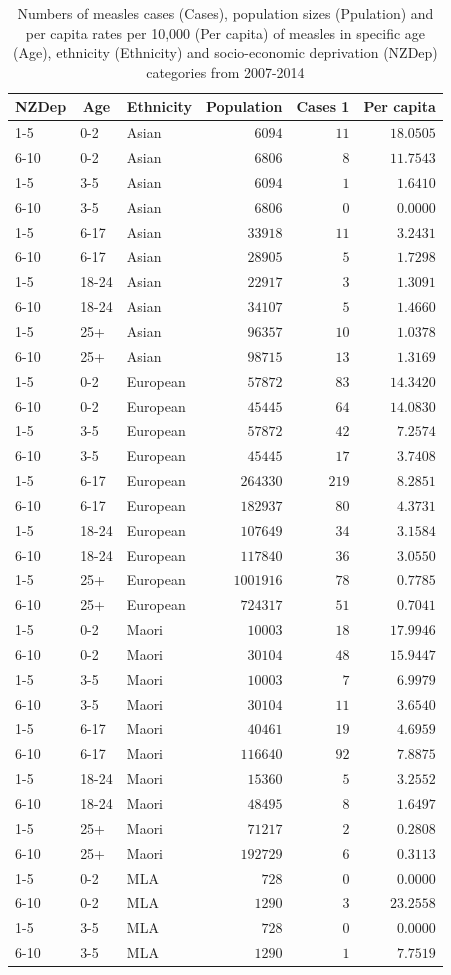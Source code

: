 \documentclass{article}
\begin{document}
\begin{table}[hbtp]
\footnotesize
\caption{Numbers of measles cases (Cases), population sizes (Ppulation) and per capita rates per 10,000 (Per capita) of measles in specific age (Age), ethnicity (Ethnicity) and socio-economic deprivation (NZDep) categories from 2007-2014}
\begin{center}
\begin{tabular}{lllrrr}
\hline\hline
\multicolumn{1}{c}{NZDep}&\multicolumn{1}{c}{Age}&\multicolumn{1}{c}{Ethnicity}&\multicolumn{1}{c}{Population}&\multicolumn{1}{c}{Cases 1}&\multicolumn{1}{c}{Per capita}\tabularnewline
\hline
1-5&0-2&Asian&$   6094$&$ 11$&$18.0505$\tabularnewline
6-10&0-2&Asian&$   6806$&$  8$&$11.7543$\tabularnewline
1-5&3-5&Asian&$   6094$&$  1$&$ 1.6410$\tabularnewline
6-10&3-5&Asian&$   6806$&$  0$&$ 0.0000$\tabularnewline
1-5&6-17&Asian&$  33918$&$ 11$&$ 3.2431$\tabularnewline
6-10&6-17&Asian&$  28905$&$  5$&$ 1.7298$\tabularnewline
1-5&18-24&Asian&$  22917$&$  3$&$ 1.3091$\tabularnewline
6-10&18-24&Asian&$  34107$&$  5$&$ 1.4660$\tabularnewline
1-5&25+&Asian&$  96357$&$ 10$&$ 1.0378$\tabularnewline
6-10&25+&Asian&$  98715$&$ 13$&$ 1.3169$\tabularnewline
1-5&0-2&European&$  57872$&$ 83$&$14.3420$\tabularnewline
6-10&0-2&European&$  45445$&$ 64$&$14.0830$\tabularnewline
1-5&3-5&European&$  57872$&$ 42$&$ 7.2574$\tabularnewline
6-10&3-5&European&$  45445$&$ 17$&$ 3.7408$\tabularnewline
1-5&6-17&European&$ 264330$&$219$&$ 8.2851$\tabularnewline
6-10&6-17&European&$ 182937$&$ 80$&$ 4.3731$\tabularnewline
1-5&18-24&European&$ 107649$&$ 34$&$ 3.1584$\tabularnewline
6-10&18-24&European&$ 117840$&$ 36$&$ 3.0550$\tabularnewline
1-5&25+&European&$1001916$&$ 78$&$ 0.7785$\tabularnewline
6-10&25+&European&$ 724317$&$ 51$&$ 0.7041$\tabularnewline
1-5&0-2&Maori&$  10003$&$ 18$&$17.9946$\tabularnewline
6-10&0-2&Maori&$  30104$&$ 48$&$15.9447$\tabularnewline
1-5&3-5&Maori&$  10003$&$  7$&$ 6.9979$\tabularnewline
6-10&3-5&Maori&$  30104$&$ 11$&$ 3.6540$\tabularnewline
1-5&6-17&Maori&$  40461$&$ 19$&$ 4.6959$\tabularnewline
6-10&6-17&Maori&$ 116640$&$ 92$&$ 7.8875$\tabularnewline
1-5&18-24&Maori&$  15360$&$  5$&$ 3.2552$\tabularnewline
6-10&18-24&Maori&$  48495$&$  8$&$ 1.6497$\tabularnewline
1-5&25+&Maori&$  71217$&$  2$&$ 0.2808$\tabularnewline
6-10&25+&Maori&$ 192729$&$  6$&$ 0.3113$\tabularnewline
1-5&0-2&MLA&$    728$&$  0$&$ 0.0000$\tabularnewline
6-10&0-2&MLA&$   1290$&$  3$&$23.2558$\tabularnewline
1-5&3-5&MLA&$    728$&$  0$&$ 0.0000$\tabularnewline
6-10&3-5&MLA&$   1290$&$  1$&$ 7.7519$\tabularnewline

\end{tabular}
\end{center}
\end{table}
\end{document}
